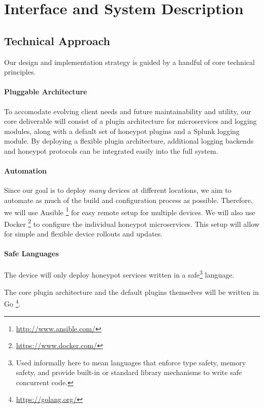 \chapter{Interface and System Description}

\section{Technical Approach}

Our design and implementation strategy is guided by a handful of core
technical principles.

\subsubsection{Pluggable Architecture}

To accomodate evolving client needs and future maintainability and utility,
our core deliverable will consist of a plugin architecture
for microservices and logging modules, along with a default set of honeypot
plugins and a Splunk logging module. By deploying a flexible plugin
architecture, additional logging backends and honeypot protocols can be
integrated easily into the full system.

\subsubsection{Automation}

Since our goal is to deploy \textit{many} devices at different
locations, we aim to automate as much of the build and configuration process
as possible. Therefore, we will use Ansible
\footnote{\url{http://www.ansible.com/}} for easy remote setup for
multiple devices. We will also use Docker
\footnote{\url{https://www.docker.com/}} to configure the individual
honeypot microservices. This setup will allow for simple and flexible device
rollouts and updates.

\subsubsection{Safe Languages}

The device will only deploy honeypot services written in a
safe\footnote{Used informally here to mean languages that enforce type
safety, memory safety, and provide built-in or standard library mechanisms to
write safe concurrent code.} language.

The core plugin architecture and the default plugins themselves will be written
in Go \footnote{\url{https://golang.org/}}.

